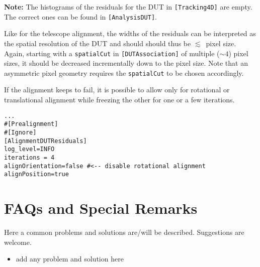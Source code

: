 \textbf{Note:} The histograms of the residuals for the DUT in \texttt{[Tracking4D]} are empty. The correct ones can be found in \texttt{[AnalysisDUT]}.

Like for the telescope alignment, the widths of the residuals can be interpreted as the spatial resolution of the DUT and should should thus be $\lesssim$~pixel size.
Again, starting with a \texttt{spatialCut} in \texttt{[DUTAssociation]} of multiple ($\sim4$) pixel sizes, it should be decreased incrementally down to the pixel size. Note that an asymmetric pixel geometry requires the \texttt{spatialCut} to be chosen accordingly.

If the alignment keeps to fail, it is possible to allow only for rotational or translational alignment while freezing the other for one or a few iterations.

\begin{verbatim}
...
#[Prealignment]
#[Ignore]
[AlignmentDUTResiduals]
log_level=INFO
iterations = 4
alignOrientation=false #<-- disable rotational alignment
alignPosition=true
\end{verbatim}

\section{FAQs and Special Remarks}
Here a common problems and solutions are/will be described.
Suggestions are welcome.
\begin{itemize}
\item add any problem and solution here
\end{itemize}
